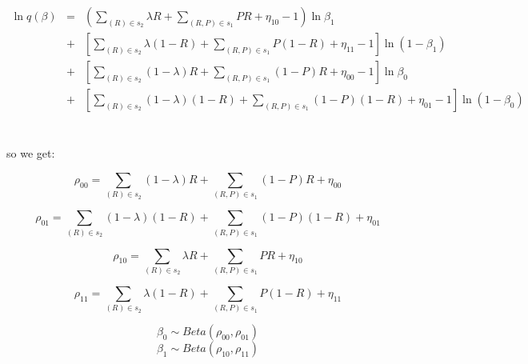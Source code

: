 \documentclass[11pt]{report}
\begin{document}
\begin{eqnarray*}
    \ln q(\beta) &=& (\sum_{(R)\in s_2}\lambda R + \sum_{(R,P)\in s_1}PR +\eta_{10}-1)\ln{\beta_{1}}\\
    &+&[\sum_{(R)\in s_2}\lambda (1-R) + \sum_{(R,P)\in s_1}P(1-R)+\eta_{11}-1]\ln(1-\beta_{1})\\
    &+&[\sum_{(R)\in s_2}(1-\lambda)R + \sum_{(R,P)\in s_1}(1-P)R +\eta_{00}-1]\ln{\beta_0}\\
    &+&[\sum_{(R)\in s_2}(1-\lambda)(1-R) + \sum_{(R,P)\in s_1}(1-P)(1-R) +\eta_{01}-1]\ln(1-\beta_{0})
\end{eqnarray*}
\\
\\
so we get:

\begin{equation}
    \rho_{00} = \sum_{(R)\in s_2}(1-\lambda)R + \sum_{(R,P)\in s_1}(1-P)R +\eta_{00}
\end{equation}

\begin{equation}
    \rho_{01} = \sum_{(R)\in s_2}(1-\lambda)(1-R) + \sum_{(R,P)\in s_1}(1-P)(1-R) +\eta_{01}
\end{equation}

\begin{equation}
    \rho_{10} = \sum_{(R)\in s_2}\lambda R + \sum_{(R,P)\in s_1}PR +\eta_{10}
\end{equation}

\begin{equation}
    \rho_{11} = \sum_{(R)\in s_2}\lambda (1-R) + \sum_{(R,P)\in s_1}P(1-R)+\eta_{11}
\end{equation}


\begin{equation}
    \beta_{0} \sim Beta(\rho_{00}, \rho_{01})
\end{equation}
\begin{equation}
    \beta_{1} \sim Beta(\rho_{10}, \rho_{11})
\end{equation}
\end{document}
